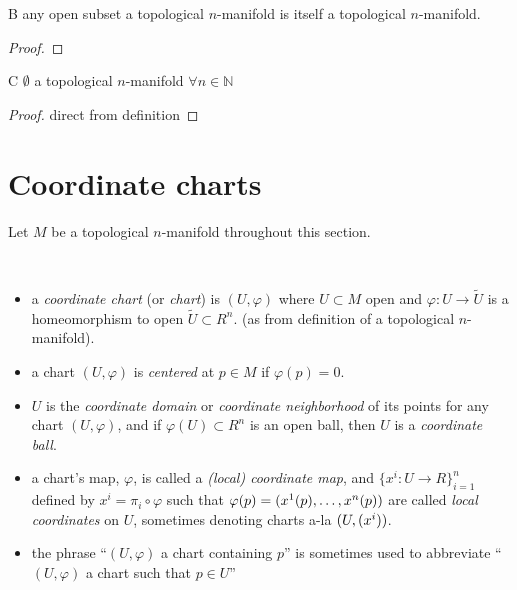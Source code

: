 \begin{rem}{B}\label{rem:01:open-is-submani}
  any open subset a topological $n$-manifold is itself a
  topological $n$-manifold.
\end{rem}
\begin{proof}
\end{proof}

\begin{rem}{C}
  $\emptyset$ a topological $n$-manifold $\forall n\in\mathbb N$
\end{rem}
\begin{proof}
  direct from definition
\end{proof}

\section{Coordinate charts}
Let $M$ be a topological $n$-manifold throughout this section.
\begin{defn}\
  \begin{itemize}
  \item
    a \emph{coordinate chart} (or \emph{chart}) is $(U,\varphi)$
    where $U\subset M$ open and
    $\varphi: U\rightarrow \widetilde U$
    is a homeomorphism to open $\widetilde U\subset R^n$.
    (as from definition of a topological $n$-manifold).
  \item
    a chart $(U,\varphi)$ is \emph{centered} at $p\in M$
    if $\varphi(p)=0$.
  \item
    $U$ is the \emph{coordinate domain} or
    \emph{coordinate neighborhood} of its points for any chart
    $(U,\varphi)$,
    and if $\varphi(U)\subset R^n$ is an open ball, then
    $U$ is a \emph{coordinate ball}.
  \item
    a chart's map, $\varphi$, is called a
    \emph{(local) coordinate map}, and
    $\{x^i: U\rightarrow R\}_{i=1}^n$
    defined by
    $x^i=\pi_i\circ\varphi$
    such that
    $\varphi(p)=(x^1\small(p\small),\ldots,x^n\small(p\small))$
    are called \emph{local coordinates} on $U$,
    sometimes denoting charts a-la
    $(U, \small(x^i\small))$.
  \item
    the phrase
    ``$(U,\varphi)$ a chart containing $p$''
    is sometimes used to abbreviate
    ``$(U,\varphi)$ a chart such that $p\in U$''
  \end{itemize}
\end{defn}


